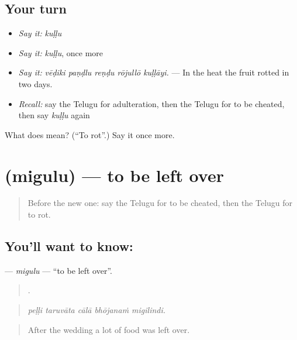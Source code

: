 \subsection*{Your turn}
\begin{itemize}
\raggedright
  \item \emph{Say it:} \emph{kuḷḷu}
  \item \emph{Say it:} \emph{kuḷḷu}, once more
  \item \emph{Say it:} \emph{vēḍiki paṇḍlu reṇḍu rōjullō kuḷḷāyi.} — In the heat the fruit rotted in two days.
  \item \emph{Recall:} say the Telugu for adulteration, then the Telugu for to be cheated, then say \emph{kuḷḷu} again
\end{itemize}

\begin{tcolorbox}[breakable,colback=teal!4,colframe=teal!35!black,title={Before you move on}]
What does  mean? (\textquotedblleft{}To rot\textquotedblright{}.) Say it once more.
\end{tcolorbox}
\section[\texorpdfstring{\te{మిగులు} (migulu)}{మిగులు (migulu)}]{ (migulu) — to be left over}

\label{lesson:TE-C489-migulu}



\begin{quote}
Before the new one: say the Telugu for to be cheated, then the Telugu for to rot.
\end{quote}

\subsection*{You'll want to know: }
\textbf{} — \emph{migulu} — \textquotedblleft{}to be left over\textquotedblright{}.

\begin{quote}
    .
\end{quote}

\begin{quote}
\emph{peḷḷi taruvāta cālā bhōjanaṁ migilindi.}
\end{quote}

\begin{quote}
After the wedding a lot of food was left over.
\end{quote}

